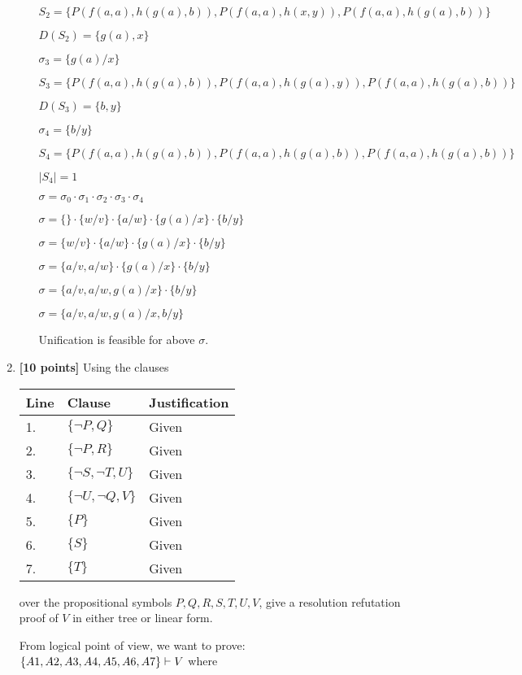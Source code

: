\documentclass{article}
\begin{document}
\begin{enumerate}
\begin{enumerate}
\begin{answer}
		$S_2 = \{P(f(a, a), h(g(a),b)), P(f(a, a), h(x, y)), P(f(a, a), h(g(a), b))\}$

		$D(S_2) = \{g(a), x\}$	
		
		$\sigma_3 = \{g(a)/x\}$
		
		$S_3 = \{P(f(a, a), h(g(a),b)), P(f(a, a), h(g(a), y)), P(f(a, a), h(g(a), b))\}$
		
		$D(S_3) = \{b, y\}$	
		
		$\sigma_4 = \{b/y\}$
		
		$S_4 = \{P(f(a, a), h(g(a),b)), P(f(a, a), h(g(a), b)), P(f(a, a), h(g(a), b))\}$
		
		$|S_4| = 1$	
	
		\bigskip
		
		$\sigma = \sigma_0 \cdot{} \sigma_1 \cdot{} \sigma_2 \cdot{} \sigma_3 \cdot{} \sigma_4$
		
		$\sigma = \{\} \cdot{} \{w/v\}   \cdot{} \{a/w\}  \cdot{} \{g(a)/x\} \cdot{} \{b/y\}$
		
		$\sigma = \{w/v\}   \cdot{} \{a/w\}  \cdot{} \{g(a)/x\} \cdot{} \{b/y\}$
		
		$\sigma = \{a/v, a/w\} \cdot{} \{g(a)/x\} \cdot{} \{b/y\}$
		
		$\sigma = \{a/v, a/w, g(a)/x\} \cdot{} \{b/y\}$
		
		$\sigma = \{a/v, a/w, g(a)/x, b/y\}$
		
		Unification is feasible for above $\sigma$.
    \end{answer}
  \end{enumerate}

\newpage

\item \textbf{[10 points]} Using the clauses
  \begin{center}
    \begin{tabular}{lll}
      Line & Clause & Justification \\ \hline
      1. & $\{ \neg P, Q \}$ & Given \\
      2. & $\{ \neg P, R \}$ & Given \\
      3. & $\{ \neg S, \neg T, U \}$ & Given \\
      4. & $\{ \neg U, \neg Q, V \}$ & Given \\
      5. & $\{ P \}$ & Given \\
      6. & $\{ S \}$ & Given \\
      7. & $\{ T \}$ & Given \\ \hline
    \end{tabular}
  \end{center}
  over the propositional symbols $P,Q,R,S,T,U,V$, give a resolution
  refutation proof of $V$ in either tree or linear form.
  \begin{answer}
  From logical point of view, we want to prove: $\{A1, A2, A3, A4, A5, A6, A7\} \vdash V$ where
  

\end{answer}
\end{enumerate}
\end{document}
